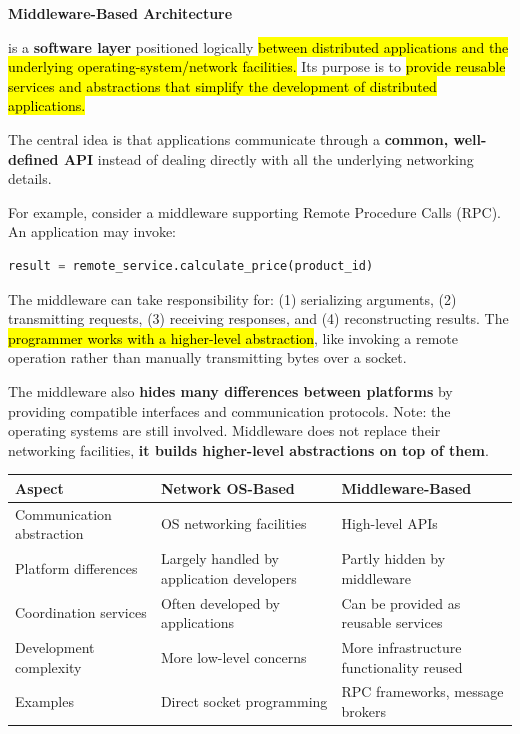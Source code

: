 \highspace
\begin{flushleft}
    \textcolor{Green3}{ \textbf{Middleware-Based Architecture}}
\end{flushleft}
 is a \textbf{software layer} positioned logically \hl{between distributed applications and the underlying operating-system/network facilities.} Its purpose is to \hl{provide reusable services and abstractions that simplify the development of distributed applications.}

\highspace
\textcolor{Green3}{} The central idea is that applications communicate through a \textbf{common, well-defined API} instead of dealing directly with all the underlying networking details.

\highspace
For example, consider a middleware supporting Remote Procedure Calls (RPC). An application may invoke:
\begin{lstlisting}[language=python]
result = remote_service.calculate_price(product_id)
\end{lstlisting}
The middleware can take responsibility for: (1) serializing arguments, (2) transmitting requests, (3) receiving responses, and (4) reconstructing results. The \hl{programmer works with a higher-level abstraction}, like invoking a remote operation rather than manually transmitting bytes over a socket.

\highspace
The middleware also \textbf{hides many differences between platforms} by providing compatible interfaces and communication protocols.
Note: the operating systems are still involved. Middleware does not replace their networking facilities, \textbf{it builds higher-level abstractions on top of them}.

\highspace
\begin{table}[!htp]
    \centering
    \begin{tabular}{@{} >{\raggedright\arraybackslash}p{.22\linewidth} >{\raggedright\arraybackslash}p{.34\linewidth} >{\raggedright\arraybackslash}p{.34\linewidth} @{}}
        \toprule
        \textbf{Aspect} & \textbf{Network OS-Based} & \textbf{Middleware-Based} \\
        \midrule
        Communication abstraction & OS networking facilities & High-level APIs \\[1.8em]
        Platform differences & Largely handled by application developers & Partly hidden by middleware \\[1.8em]
        Coordination services & Often developed by applications & Can be provided as reusable services \\[1.8em]
        Development complexity & More low-level concerns & More infrastructure functionality reused \\[1.8em]
        Examples & Direct socket programming & RPC frameworks, message brokers \\
        \bottomrule
    \end{tabular}
\end{table}

